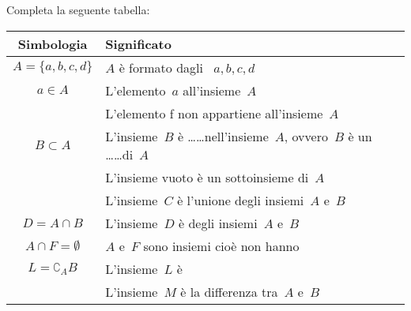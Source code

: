 % 

\begin{esercizio}
\label{ese:7.67}
Completa la seguente tabella:

\begin{tabular*}{.9\textwidth}{@{\extracolsep{\fill}}*{2}{cl}}
\toprule
Simbologia & Significato\\
\midrule
$A=\{a,b,c,d\}$ & $A$ è formato dagli \dotfill~$a, b, c, d$\\
$a\in A$ & L'elemento~$a$ \dotfill all'insieme~$A$\\
\dotfill & L'elemento f non appartiene all'insieme~$A$\\
$B\subset A$ & L'insieme~$B$ è \ldots\ldots nell'insieme~$A$, ovvero~$B$ è un 
\ldots\ldots di~$A$\\
\dotfill & L'insieme vuoto è un sottoinsieme di~$A$\\
\dotfill & L'insieme~$C$ è l'unione degli insiemi~$A$ e~$B$\\
$D=A\cap B$ & L'insieme~$D$ è \dotfill degli insiemi~$A$ e~$B$\\
$A\cap F=\emptyset $& $A$ e~$F$ sono insiemi \dotfill cioè non hanno \dotfill \\
$L=\complement_{A}B$ & L'insieme~$L$ è \dotfill \\
\dotfill & L'insieme~$M$ è la differenza tra~$A$ e~$B$\\
\bottomrule
\end{tabular*}
\end{esercizio}

